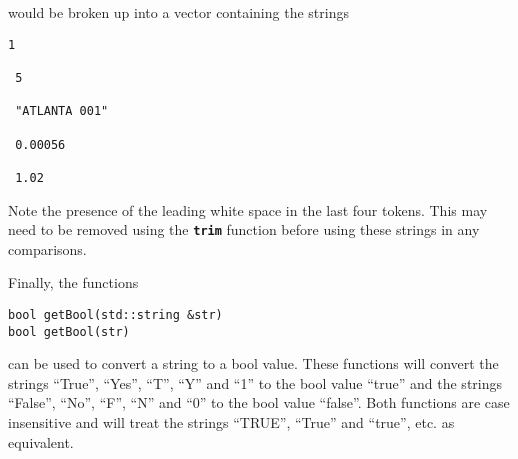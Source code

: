 would be broken up into a vector containing the strings

{
\color{red}
\begin{Verbatim}[fontseries=b]
1

 5

 "ATLANTA 001"

 0.00056

 1.02
\end{Verbatim}
}
Note the presence of the leading white space in the last four tokens. This may
need to be removed using the \texttt{\textbf{trim}} function before using these
strings in any comparisons.

Finally, the functions

{
\color{red}
\begin{Verbatim}[fontseries=b]
bool getBool(std::string &str)
bool getBool(str)
\end{Verbatim}
}

can be used to convert a string to a bool value. These functions
will convert the strings ``True'', ``Yes'', ``T'', ``Y'' and ``1'' to
the bool value ``true'' and the strings ``False'', ``No'', ``F'', ``N'' and
``0'' to the bool value ``false''. Both functions are case insensitive and will
treat the strings ``TRUE'', ``True'' and ``true'', etc. as equivalent.
